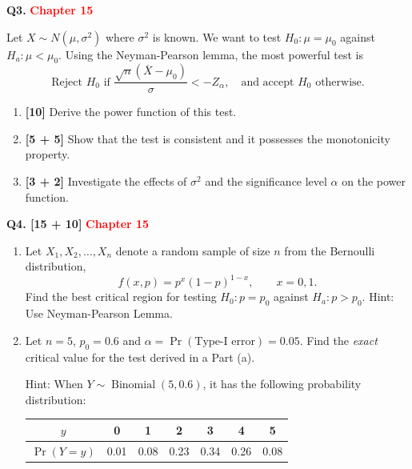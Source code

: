 \documentclass[11pt]{article}
\begin{document}
\bigskip

\textbf{Q3.} \textbf{\textcolor{red}{Chapter 15}}

Let $X\sim N(\mu,\sigma^2)$ where $\sigma^2$ is known. We want to test $H_0:\mu=\mu_0$ against $H_a:\mu<\mu_0$. Using the Neyman-Pearson lemma, the most powerful test is
\[
\text{Reject }H_0\text{ if }\frac{\sqrt n(\overline X-\mu_0)}{\sigma}<-Z_\alpha,
\quad\text{and accept }H_0\text{ otherwise.}
\]
\begin{enumerate}
\item[(a)] \textbf{[10]} Derive the power function of this test.
\item[(b)] \textbf{[5 + 5]} Show that the test is consistent and it possesses the monotonicity property.
\item[(c)] \textbf{[3 + 2]} Investigate the effects of $\sigma^2$ and the significance level $\alpha$ on the power function.
\end{enumerate}

\bigskip

\textbf{Q4. [15 + 10]} \textbf{\textcolor{red}{Chapter 15}}

\begin{enumerate}
\item[(a)] Let $X_1,X_2,\ldots,X_n$ denote a random sample of size $n$ from the Bernoulli distribution,
\[
f(x,p)=p^x(1-p)^{1-x},\qquad x=0,1.
\]
Find the best critical region for testing $H_0:p=p_0$ against $H_a:p>p_0$. Hint: Use Neyman-Pearson Lemma.

\item[(b)] Let $n=5$, $p_0=0.6$ and $\alpha=\Pr(\text{Type-I error})=0.05$. Find the \emph{exact} critical value for the test derived in a Part (a).

Hint: When $Y\sim\operatorname{Binomial}(5,0.6)$, it has the following probability distribution:
\begin{center}
\begin{tabular}{c|cccccc}
$y$ & 0 & 1 & 2 & 3 & 4 & 5 \\ \hline
$\Pr(Y=y)$ & 0.01 & 0.08 & 0.23 & 0.34 & 0.26 & 0.08
\end{tabular}
\end{center}
\end{enumerate}



\clearpage
\end{document}
